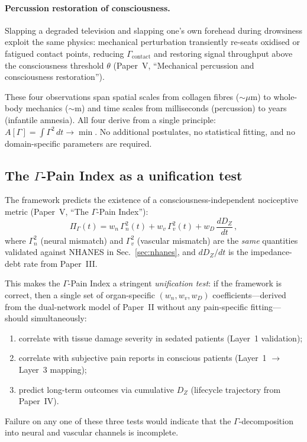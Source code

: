 \documentclass[aps,pre,twocolumn,superscriptaddress,floatfix]{revtex4-2}
\begin{document}
\paragraph{Percussion restoration of consciousness.}
Slapping a degraded television and slapping one's own
forehead during drowsiness exploit the same physics:
mechanical perturbation transiently re-seats oxidised or
fatigued contact points, reducing $\Gamma_{\text{contact}}$
and restoring signal throughput above the consciousness
threshold $\theta$
(Paper~V, ``Mechanical percussion and consciousness restoration'').

These four observations span spatial scales from collagen
fibres ($\sim\mu$m) to whole-body mechanics ($\sim$m)
and time scales from milliseconds (percussion) to years
(infantile amnesia).
All four derive from a single principle:
$A[\Gamma]=\int\Gamma^2\,dt\to\min$.
No additional postulates, no statistical fitting, and
no domain-specific parameters are required.

\subsection{The $\Gamma$-Pain Index as a unification test}
\label{sec:pain-index-unification}

The framework predicts the existence of a
consciousness-independent nociceptive metric
(Paper~V, ``The $\Gamma$-Pain Index''):
\begin{equation}
  \Pi_{\Gamma}(t) =
    w_n\,\Gamma_n^2(t) + w_v\,\Gamma_v^2(t)
    + w_D\,\frac{dD_Z}{dt}\,,
  \label{eq:GPI-unified}
\end{equation}
where $\Gamma_n^2$ (neural mismatch) and $\Gamma_v^2$
(vascular mismatch) are the \emph{same} quantities
validated against NHANES in Sec.~\ref{sec:nhanes}, and
$dD_Z/dt$ is the impedance-debt rate from Paper~III.

This makes the $\Gamma$-Pain Index a stringent
\emph{unification test}: if the framework is correct,
then a single set of organ-specific $(w_n, w_v, w_D)$
coefficients---derived from the dual-network model of
Paper~II without any pain-specific fitting---should
simultaneously:
\begin{enumerate}
  \item correlate with tissue damage severity in
    sedated patients (Layer~1 validation);
  \item correlate with subjective pain reports in
    conscious patients (Layer~1 $\to$ Layer~3 mapping);
  \item predict long-term outcomes via cumulative
    $D_Z$ (lifecycle trajectory from Paper~IV).
\end{enumerate}
Failure on any one of these three tests would indicate
that the $\Gamma$-decomposition into neural and vascular
channels is incomplete.
\end{document}
